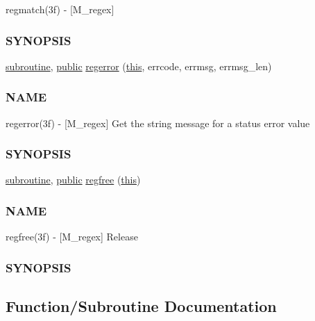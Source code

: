 \begin{DoxyCompactItemize}
\begin{DoxyCompactList}
regmatch(3f) -\/ \mbox{[}M\+\_\+regex\mbox{]} \subsubsection*{S\+Y\+N\+O\+P\+S\+IS}\end{DoxyCompactList}\item 
\hyperlink{M__stopwatch_83_8txt_acfbcff50169d691ff02d4a123ed70482}{subroutine}, \hyperlink{M__stopwatch_83_8txt_a2f74811300c361e53b430611a7d1769f}{public} \hyperlink{namespacem__regex_a7fe6dc1737cbfdf0bb8e1ddca2055a33}{regerror} (\hyperlink{M__stopwatch_83_8txt_ad62a52042bb610eee5b36b5516caec22}{this}, errcode, errmsg, errmsg\+\_\+len)
\begin{DoxyCompactList}\small\item\em \subsubsection*{N\+A\+ME}

regerror(3f) -\/ \mbox{[}M\+\_\+regex\mbox{]} Get the string message for a status error value \subsubsection*{S\+Y\+N\+O\+P\+S\+IS}\end{DoxyCompactList}\item 
\hyperlink{M__stopwatch_83_8txt_acfbcff50169d691ff02d4a123ed70482}{subroutine}, \hyperlink{M__stopwatch_83_8txt_a2f74811300c361e53b430611a7d1769f}{public} \hyperlink{namespacem__regex_a4e4e0028bd3eddc7b2444e90a2129b9e}{regfree} (\hyperlink{M__stopwatch_83_8txt_ad62a52042bb610eee5b36b5516caec22}{this})
\begin{DoxyCompactList}\small\item\em \subsubsection*{N\+A\+ME}

regfree(3f) -\/ \mbox{[}M\+\_\+regex\mbox{]} Release \subsubsection*{S\+Y\+N\+O\+P\+S\+IS}\end{DoxyCompactList}\end{DoxyCompactItemize}


\subsection{Function/\+Subroutine Documentation}
\mbox{\label{namespacem__regex_ac4e468cb031565f4f4744d8f4c9eee91}} 
